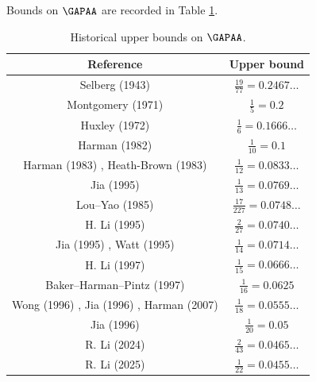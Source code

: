 Bounds on $\GAPAA$ are recorded in Table \ref{gapaa-table}.

\begin{table}[ht]
    \caption{Historical upper bounds on $\GAPAA$.}
    \label{gapaa-table}
    \centering
    \renewcommand{\arraystretch}{1.2}
    \begin{tabular}{|c|c|}
    \hline
    Reference & Upper bound \\
    \hline
    Selberg (1943) \cite{selberg_1943} & $\frac{19}{77}=0.2467\dots$\\
    \hline
    Montgomery (1971) \cite{montgomery_topics_1971} & $\frac{1}{5}=0.2$ \\
    \hline
    Huxley (1972) \cite{Huxley} & $\frac{1}{6} = 0.1666\dots$ \\
    \hline
    Harman (1982) \cite{harman_1982} & $\frac{1}{10} = 0.1$ \\
    \hline
    Harman (1983) \cite{harman_1983}, Heath-Brown (1983) \cite{heathbrown_sieve_1984}  & $\frac{1}{12} = 0.0833\dots$ \\
    \hline
    Jia (1995) \cite{jia_goldbach_1994} & $\frac{1}{13} = 0.0769\dots$ \\
    \hline
    Lou--Yao (1985) \cite{lou_yao_1985} & $\frac{17}{227}= 0.0748\dots$ \\
    \hline
    H. Li (1995) \cite{li_goldbach_1995} & $\frac{2}{27} = 0.0740\dots$ \\
    \hline
    Jia (1995) \cite{jia_difference_1995}, Watt (1995) \cite{watt_short_1995} & $\frac{1}{14}=0.0714\dots$ \\
    \hline
    H. Li (1997) \cite{li_short_1997} & $\frac{1}{15}=0.0666\dots$ \\
    \hline
    Baker--Harman--Pintz (1997) \cite{baker-harman-pintz_goldbach_1997} & $\frac{1}{16} = 0.0625$ \\
    \hline
    Wong (1996) \cite{wong_thesis_1996}, Jia (1996) \cite{jia_exceptional_1996}, Harman (2007) \cite{harman-book} & $\frac{1}{18} = 0.0555\dots$ \\
    \hline
    Jia (1996) \cite{jia_almost_all} & $\frac{1}{20} = 0.05$ \\
    \hline
    R. Li (2024) \cite{li_primes_almost_2024} & $\frac{2}{43} = 0.0465\dots$ \\
    \hline
    R. Li (2025) \cite{li_primes_almost_II_2025} & $\frac{1}{22} = 0.0455\dots$ \\
    \hline
    \end{tabular}
    \end{table}

